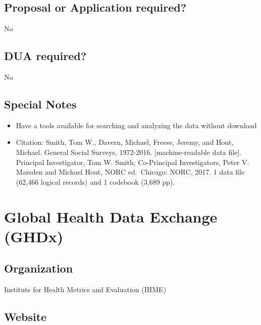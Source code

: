 \documentclass[
]{book}
\providecommand{\tightlist}{%
  \setlength{\itemsep}{0pt}\setlength{\parskip}{0pt}}
\begin{document}
\hypertarget{proposal-or-application-required-27}{%
\section{Proposal or Application required?}\label{proposal-or-application-required-27}}

No

\hypertarget{dua-required-27}{%
\section{DUA required?}\label{dua-required-27}}

No

\hypertarget{special-notes-27}{%
\section{Special Notes}\label{special-notes-27}}

\begin{itemize}
\tightlist
\item
  Have a tools available for searching and analyzing the data without download
\item
  Citation: Smith, Tom W., Davern, Michael, Freese, Jeremy, and Hout, Michael. General Social Surveys, 1972-2016. {[}machine-readable data file{]}. Principal Investigator, Tom W. Smith; Co-Principal Investigators, Peter V. Marsden and Michael Hout, NORC ed.~Chicago: NORC, 2017. 1 data file (62,466 logical records) and 1 codebook (3,689 pp).
\end{itemize}

\mainmatter

\hypertarget{global-health-data-exchange-ghdx}{%
\chapter{Global Health Data Exchange (GHDx)}\label{global-health-data-exchange-ghdx}}

\hypertarget{organization-28}{%
\section{Organization}\label{organization-28}}

Institute for Health Metrics and Evaluation (IHME)

\hypertarget{website-28}{%
\section{Website}\label{website-28}}
\end{document}
